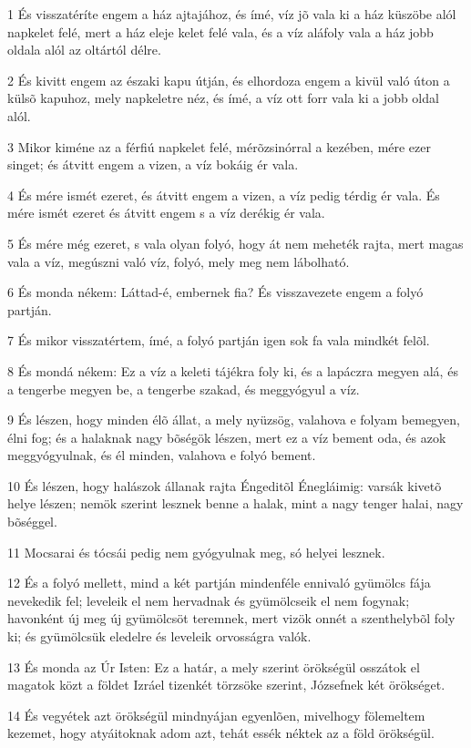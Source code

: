 \par 1 És visszatéríte engem a ház ajtajához, és ímé, víz jõ vala ki a ház küszöbe alól napkelet felé, mert a ház eleje kelet felé vala, és a víz aláfoly vala a ház jobb oldala alól az oltártól délre.
\par 2 És kivitt engem az északi kapu útján, és elhordoza engem a kivül való úton a külsõ kapuhoz, mely napkeletre néz, és ímé, a víz ott forr vala ki a jobb oldal alól.
\par 3 Mikor kiméne az a férfiú napkelet felé, mérõzsinórral a kezében, mére ezer singet; és átvitt engem a vizen, a víz bokáig ér vala.
\par 4 És mére ismét ezeret, és átvitt engem a vizen, a víz pedig térdig ér vala. És mére ismét ezeret és átvitt engem s a víz derékig ér vala.
\par 5 És mére még ezeret, s vala olyan folyó, hogy át nem meheték rajta, mert magas vala a víz, megúszni való víz, folyó, mely meg nem lábolható.
\par 6 És monda nékem: Láttad-é, embernek fia? És visszavezete engem a folyó partján.
\par 7 És mikor visszatértem, ímé, a folyó partján igen sok fa vala mindkét felõl.
\par 8 És mondá nékem: Ez a víz a keleti tájékra foly ki, és a lapáczra megyen alá, és a tengerbe megyen be, a tengerbe szakad, és meggyógyul a víz.
\par 9 És lészen, hogy minden élõ állat, a mely nyüzsög, valahova e folyam bemegyen, élni fog; és a halaknak nagy bõségök lészen, mert ez a víz bement oda, és azok meggyógyulnak, és él minden, valahova e folyó bement.
\par 10 És lészen, hogy halászok állanak rajta Éngeditõl Énegláimig: varsák kivetõ helye lészen; nemök szerint lesznek benne a halak, mint a nagy tenger halai, nagy bõséggel.
\par 11 Mocsarai és tócsái pedig nem gyógyulnak meg, só helyei lesznek.
\par 12 És a folyó mellett, mind a két partján mindenféle ennivaló gyümölcs fája nevekedik fel; leveleik el nem hervadnak és gyümölcseik el nem fogynak; havonként új meg új gyümölcsöt teremnek, mert vizök onnét a szenthelybõl  foly ki; és gyümölcsük eledelre és leveleik orvosságra valók.
\par 13 És monda az Úr Isten: Ez a határ, a mely szerint örökségül osszátok el magatok közt a földet Izráel tizenkét törzsöke szerint, Józsefnek két örökséget.
\par 14 És vegyétek azt örökségül mindnyájan egyenlõen, mivelhogy fölemeltem kezemet, hogy atyáitoknak adom azt, tehát essék néktek az a föld örökségül.
